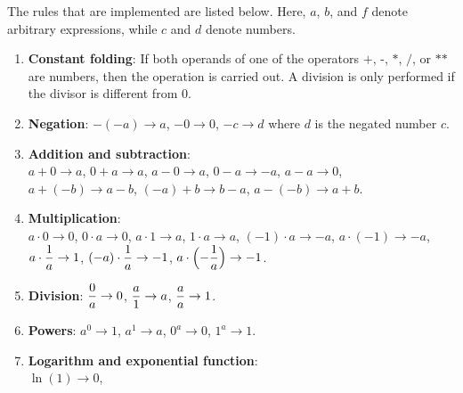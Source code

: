 \begin{enumerate}
      The rules that are implemented are listed below.  Here, $a$, $b$, and $f$ denote arbitrary
      expressions, while $c$ and $d$ denote numbers.
      \begin{enumerate}
      \item \textbf{Constant folding}:  If both operands of one of the operators
            $\texttt{+}$, $\texttt{-}$, $\texttt{*}$, $\texttt{/}$, or $\texttt{**}$ are numbers, then the
            operation is carried out.  A division is only performed if the divisor is different from $0$.
      \item \textbf{Negation}:
            $-(-a) \rightarrow a$, \quad
            $-0 \rightarrow 0$, \quad
            $-c \rightarrow d$ \; where $d$ is the negated number $c$.
      \item \textbf{Addition and subtraction}:
            \\[0.1cm]
            $a + 0 \rightarrow a$, \quad
            $0 + a \rightarrow a$, \quad
            $a - 0 \rightarrow a$, \quad
            $0 - a \rightarrow -a$, \quad
            $a - a \rightarrow 0$,
            \\[0.1cm]
            $a + (-b) \rightarrow a - b$, \quad
            $(-a) + b \rightarrow b - a$, \quad
            $a - (-b) \rightarrow a + b$.
      \item \textbf{Multiplication}:
            \\[0.1cm]
            $a \cdot 0 \rightarrow 0$, \quad
            $0 \cdot a \rightarrow 0$, \quad
            $a \cdot 1 \rightarrow a$, \quad
            $1 \cdot a \rightarrow a$, \quad
            $(-1) \cdot a \rightarrow -a$, \quad
            $a \cdot (-1) \rightarrow -a$,
            \\[0.1cm]
            $\displaystyle a \cdot \frac{1}{a} \rightarrow 1$, \quad
            $\displaystyle (-a) \cdot \frac{1}{a} \rightarrow -1$, \quad
            $\displaystyle a \cdot \Bigl(-\frac{1}{a}\Bigr) \rightarrow -1$.
      \item \textbf{Division}:
            $\displaystyle \frac{0}{a} \rightarrow 0$, \quad
            $\displaystyle \frac{a}{1} \rightarrow a$, \quad
            $\displaystyle \frac{a}{a} \rightarrow 1$.
      \item \textbf{Powers}:
            $a^0 \rightarrow 1$, \quad
            $a^1 \rightarrow a$, \quad
            $0^a \rightarrow 0$, \quad
            $1^a \rightarrow 1$.
      \item \textbf{Logarithm and exponential function}:
            \\[0.1cm]
            $\ln(1) \rightarrow 0$, \quad

\end{enumerate}
\end{enumerate}
